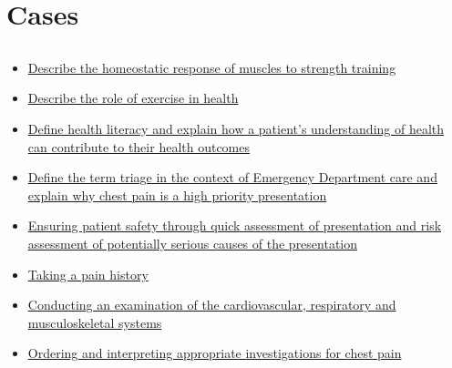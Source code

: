 \documentclass[10pt, a4paper]{article}
\begin{document}
\section{Cases}
\subsection{} \begin{itemize} \item \href{https://www.notion.so/0c5126f649f047748dc4d64b4532f80f}{Describe the homeostatic response of muscles to strength training} \item \href{https://www.notion.so/62d5ca06b8964976878b641834967bfb}{Describe the role of exercise in health} \item \href{https://www.notion.so/76d3cd96be864960b318798b9d8bbd64}{Define health literacy and explain how a patient’s understanding of health can contribute to their health outcomes} \item \href{https://www.notion.so/5aec744383eb4ce8b6275d871ff052eb}{Define the term triage in the context of Emergency Department care and explain why chest pain is a high priority presentation} \item \href{https://www.notion.so/8002f730b9b940008cd3561c79255240}{Ensuring patient safety through quick assessment of presentation and risk assessment of potentially serious causes of the presentation} \item \href{https://www.notion.so/072e9c32508043fcb3706c40713c2788}{Taking a pain history} \item \href{https://www.notion.so/a3a64c1db01b49f5b9c88574d17af0ba}{Conducting an examination of the cardiovascular, respiratory and musculoskeletal systems} \item \href{https://www.notion.so/6cd37028ad2840489f4db843c10a9727}{Ordering and interpreting appropriate investigations for chest pain} \end{itemize}
\end{document}
